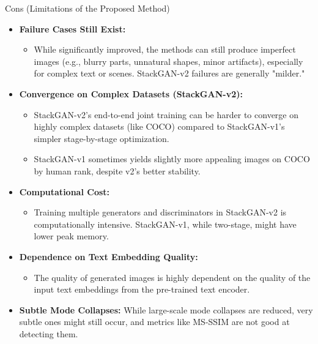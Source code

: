 \documentclass{beamer}
\newcommand{\paperfigure}[3][width=\textwidth]{%
    \begin{figure}%
        \centering%
        \texttt{[image: figures/\#2.png]}%
        \caption{#3 (Source:~\cite{stackgan++})}%
    \end{figure}%
}
\begin{document}
\begin{frame}{Cons (Limitations of the Proposed Method)}
    \begin{itemize}
        \item \textbf{Failure Cases Still Exist:}
            \begin{itemize}
                \item While significantly improved, the methods can still produce imperfect images (e.g., blurry parts, unnatural shapes, minor artifacts), especially for complex text or scenes. StackGAN-v2 failures are generally "milder."
            \end{itemize}
        \item \textbf{Convergence on Complex Datasets (StackGAN-v2):}
            \begin{itemize}
                \item StackGAN-v2's end-to-end joint training can be harder to converge on highly complex datasets (like COCO) compared to StackGAN-v1's simpler stage-by-stage optimization.
                \item StackGAN-v1 sometimes yields slightly more appealing images on COCO by human rank, despite v2's better stability.
            \end{itemize}
        \item \textbf{Computational Cost:}
            \begin{itemize}
                \item Training multiple generators and discriminators in StackGAN-v2 is computationally intensive. StackGAN-v1, while two-stage, might have lower peak memory.
            \end{itemize}
        \item \textbf{Dependence on Text Embedding Quality:}
            \begin{itemize}
                \item The quality of generated images is highly dependent on the quality of the input text embeddings from the pre-trained text encoder.
            \end{itemize}
        \item \textbf{Subtle Mode Collapses:} While large-scale mode collapses are reduced, very subtle ones might still occur, and metrics like MS-SSIM are not good at detecting them.
    \end{itemize}
\end{frame}
\end{document}
